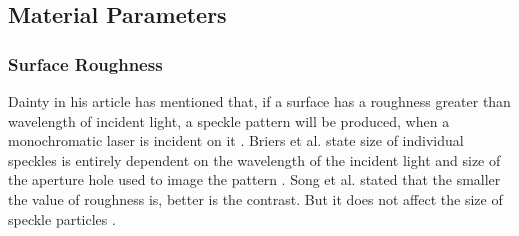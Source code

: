 \vspace{5mm}
\subsection{Material Parameters}

    \subsubsection{Surface Roughness}
    Dainty in his article has mentioned that, if a surface has a roughness greater than wavelength of incident light, a speckle pattern will be produced, when a monochromatic laser is incident on it \cite{dainty}. Briers et al. state size of individual speckles is entirely dependent on the wavelength of the incident light and size of the aperture hole used to image the pattern \cite{briers}. Song et al. stated that the smaller the value of roughness is, better is the contrast. But it does not affect the size of speckle particles \cite{song}.
    

